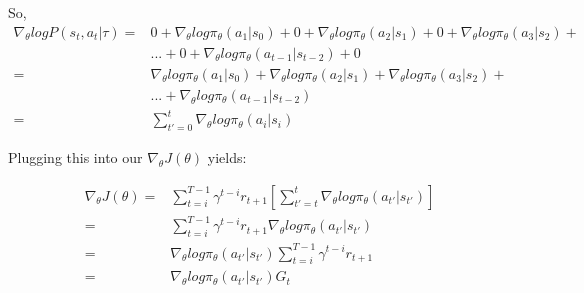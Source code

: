 \documentclass[letterpaper,11pt]{article}
\begin{document}
So, 
$$
\begin{aligned}
    \nabla_{\theta} log P(s_{t}, a_{t} | \tau) ={}& 0 + \nabla_{\theta} log \pi_{\theta}(a_{1} | s_{0}) + 0 + \nabla_{\theta} log \pi_{\theta}(a_{2} | s_{1}) + 0 + \nabla_{\theta} log \pi_{\theta}(a_{3} | s_{2}) + \\ & {} ... {} + {} 0 + \nabla_{\theta} log \pi_{\theta}(a_{t-1} | s_{t-2}) + 0 \\ ={}& \nabla_{\theta} log \pi_{\theta}(a_{1} | s_{0}) + \nabla_{\theta} log \pi_{\theta}(a_{2} | s_{1}) + \nabla_{\theta} log \pi_{\theta}(a_{3} | s_{2}) + \\
& ... + \nabla_{\theta} log \pi_{\theta}(a_{t-1} | s_{t-2}) \\ ={}& \sum\limits_{t'=0}^{t} \nabla_{\theta} log \pi_{\theta}(a_{i} | s_{i})                                                
\end{aligned}
$$

Plugging this into our $\nabla_{\theta} J(\theta)$ yields:

$$
\begin{aligned}
    \nabla_{\theta} J(\theta) ={}& \sum\limits_{t = i}^{T - 1} \gamma^{t - i} r_{t+1} [\sum\limits_{t' = t}^{t} \nabla_{\theta} log \pi_{\theta}(a_{t'} | s_{t'})] \\
    ={}& \sum\limits_{t = i}^{T - 1} \gamma^{t - i} r_{t+1}  \nabla_{\theta} log \pi_{\theta}(a_{t'} | s_{t'}) \\
    ={}& \nabla_{\theta} log \pi_{\theta}(a_{t'} | s_{t'}) \sum\limits_{t = i}^{T - 1} \gamma^{t - i} r_{t+1} \\
    ={}& \nabla_{\theta} log \pi_{\theta}(a_{t'} | s_{t'}) G_{t} 
\end{aligned}
$$
\end{document}
